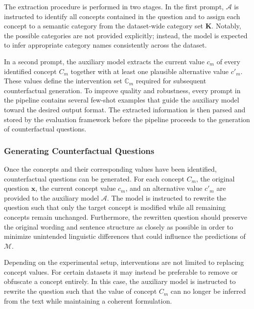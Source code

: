 The extraction procedure is performed in two stages. In the first prompt, $\mathcal{A}$ is instructed to identify all concepts contained in the question and to assign each concept to a semantic category from the dataset-wide category set $\mathbf{K}$. Notably, the possible categories are not provided explicitly; instead, the model is expected to infer appropriate category names consistently across the dataset.

In a second prompt, the auxiliary model extracts the current value $c_m$ of every identified concept $C_m$ together with at least one plausible alternative value $c'_m$. These values define the intervention set $\mathbb{C}_m$ required for subsequent counterfactual generation. To improve quality and robustness, every prompt in the pipeline contains several few-shot examples that guide the auxiliary model toward the desired output format. The extracted information is then parsed and stored by the evaluation framework before the pipeline proceeds to the generation of counterfactual questions.

\subsubsection{Generating Counterfactual Questions}

Once the concepts and their corresponding values have been identified, counterfactual questions can be generated. For each concept $C_m$, the original question $\mathbf{x}$, the current concept value $c_m$, and an alternative value $c'_m$ are provided to the auxiliary model $\mathcal{A}$. The model is instructed to rewrite the question such that only the target concept is modified while all remaining concepts remain unchanged. Furthermore, the rewritten question should preserve the original wording and sentence structure as closely as possible in order to minimize unintended linguistic differences that could influence the predictions of $\mathcal{M}$.

Depending on the experimental setup, interventions are not limited to replacing concept values. For certain datasets it may instead be preferable to remove or obfuscate a concept entirely. In this case, the auxiliary model is instructed to rewrite the question such that the value of concept $C_m$ can no longer be inferred from the text while maintaining a coherent formulation.

